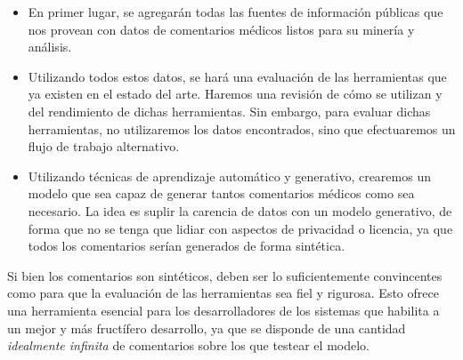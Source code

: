 \begin{itemize}
	\item En primer lugar, se agregarán todas las fuentes de información públicas que nos provean con datos de comentarios médicos listos para su minería y análisis.
	\item Utilizando todos estos datos, se hará una evaluación de las herramientas que ya existen en el estado del arte. Haremos una revisión de cómo se utilizan y del rendimiento de dichas herramientas. Sin embargo, para evaluar dichas herramientas, no utilizaremos los datos encontrados, sino que efectuaremos un flujo de trabajo alternativo. 
	\item Utilizando técnicas de aprendizaje automático y generativo, crearemos un modelo que sea capaz de generar tantos comentarios médicos como sea necesario. La idea es suplir la carencia de datos con un modelo generativo, de forma que no se tenga que lidiar con aspectos de privacidad o licencia, ya que todos los comentarios serían generados de forma sintética. 
\end{itemize}



Si bien los comentarios son sintéticos, deben ser lo suficientemente convincentes como para que la evaluación de las herramientas sea fiel y rigurosa. Esto ofrece una herramienta esencial para los desarrolladores de los sistemas que habilita a un mejor y más fructífero desarrollo, ya que se disponde de una cantidad \textit{idealmente infinita} de comentarios sobre los que testear el modelo.



